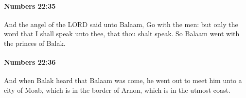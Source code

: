 		\paragraph{Numbers 22:35} %
			\label{NUMBERS-22-35}

			And the angel of the LORD said unto Balaam, Go with the men: but only the word that I shall speak unto thee, that thou shalt speak. So Balaam went with the princes of Balak.


		\paragraph{Numbers 22:36} %
			\label{NUMBERS-22-36}

			And when Balak heard that Balaam was come, he went out to meet him unto a city of Moab, which is in the border of Arnon, which is in the utmost coast.


